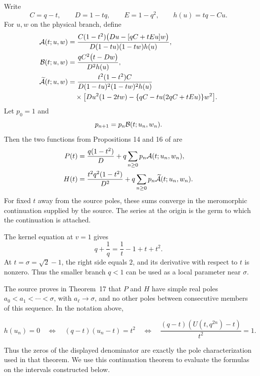 \documentclass[11pt]{article}
\theoremstyle{definition}
\theoremstyle{remark}
\begin{document}
Write
\[
  C=q-t,\qquad D=1-tq,\qquad E=1-q^2,
  \qquad h(u)=tq-Cu.
\]
For \(u,w\) on the physical branch, define
\begin{align}
 {\cal A}(t;u,w)
  &=
  \frac{C(1-t^2)
   \bigl(Du-[qC+tEu]w\bigr)}
  {D(1-tu)(1-tw)h(u)},                                      \label{eq:A}\\
 {\cal B}(t;u,w)
  &=
  \frac{qC^2\bigl(t-Dw\bigr)}
  {D^2h(u)},                                                 \label{eq:B}\\
 \widetilde{\cal A}(t;u,w)
  &=
  \frac{t^2(1-t^2)C}
  {D(1-tu)^2(1-tw)^2h(u)}
  \nonumber\\
  &\quad{}\times
  \bigl[
    Du^2(1-2tw)
    -\{qC-tu(2qC+tEu)\}w^2
  \bigr].                                                    \label{eq:Ah}
\end{align}
Let \(p_0=1\) and
\[
  p_{n+1}=p_n{\cal B}(t;u_n,w_n).
\]
Then the two functions from Propositions 14 and 16 of
\cite{BacherBeaton2014} are
\begin{align}
 P(t)
   &=\frac{q(1-t^2)}{D}
     +q\sum_{n\geq0}p_n{\cal A}(t;u_n,w_n),                  \label{eq:P}\\
 H(t)
   &=\frac{t^2q^2(1-t^2)}{D^2}
     +q\sum_{n\geq0}p_n\widetilde{\cal A}(t;u_n,w_n).        \label{eq:H}
\end{align}
For fixed \(t\) away from the source poles, these sums converge in the
meromorphic continuation supplied by the source.  The series at the origin
is the germ to which the continuation is attached.

The kernel equation at \(v=1\) gives
\begin{equation}\label{eq:q-relation}
  q+\frac1q=\frac1t-1+t+t^2.
\end{equation}
At \(t=\sigma=\sqrt2-1\), the right side equals \(2\), and its derivative
with respect to \(t\) is nonzero.  Thus the smaller branch \(q<1\) can be
used as a local parameter near \(\sigma\).

The source proves in Theorem~17 that \(P\) and \(H\) have simple real poles
\(a_0<a_1<\cdots<\sigma\), with \(a_\ell\to\sigma\), and no other poles
between consecutive members of this sequence.  In the notation above,

\begin{equation}\label{eq:source-poles}
 h(u_n)=0
 \quad\Longleftrightarrow\quad
 (q-t)(u_n-t)=t^2
 \quad\Longleftrightarrow\quad
 \frac{(q-t)(U(t,q^{2n})-t)}{t^2}=1.
\end{equation}

Thus the zeros of the displayed denominator are exactly the pole
characterization used in that theorem.  We use this continuation theorem to
evaluate the formulas on the intervals constructed below.
\end{document}

